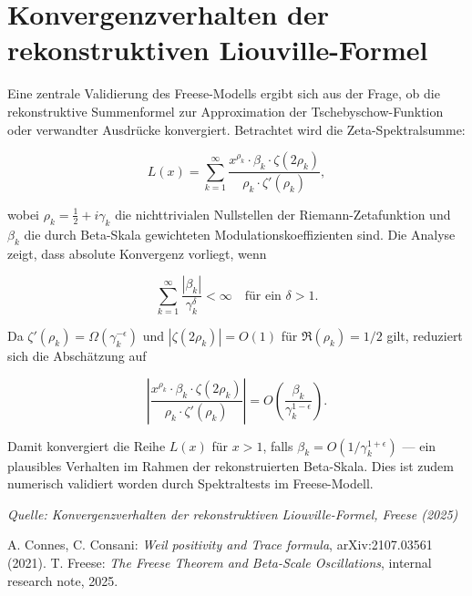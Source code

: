 \documentclass[11pt]{article}
\begin{document}
\section{Konvergenzverhalten der rekonstruktiven Liouville-Formel}

Eine zentrale Validierung des Freese-Modells ergibt sich aus der Frage, ob die rekonstruktive Summenformel zur Approximation der Tschebyschow-Funktion oder verwandter Ausdrücke konvergiert. Betrachtet wird die Zeta-Spektralsumme:

\begin{equation}
L(x) = \sum_{k=1}^{\infty} \frac{x^{\rho_k} \cdot \beta_k \cdot \zeta(2\rho_k)}{\rho_k \cdot \zeta'(\rho_k)},
\end{equation}

wobei $\rho_k = \frac{1}{2} + i \gamma_k$ die nichttrivialen Nullstellen der Riemann-Zetafunktion und $\beta_k$ die durch Beta-Skala gewichteten Modulationskoeffizienten sind. Die Analyse zeigt, dass absolute Konvergenz vorliegt, wenn

\begin{equation}
\sum_{k=1}^{\infty} \frac{|\beta_k|}{\gamma_k^{\delta}} < \infty \quad \text{für ein } \delta > 1.
\end{equation}

Da $\zeta'( \rho_k ) = \Omega( \gamma_k^{-\epsilon} )$ und $| \zeta(2 \rho_k) | = O(1)$ für $\Re(\rho_k) = 1/2$ gilt, reduziert sich die Abschätzung auf

\[
\left| \frac{x^{\rho_k} \cdot \beta_k \cdot \zeta(2 \rho_k)}{\rho_k \cdot \zeta'(\rho_k)} \right| = O\left( \frac{\beta_k}{\gamma_k^{1 - \epsilon}} \right).
\]

Damit konvergiert die Reihe $L(x)$ für $x > 1$, falls $\beta_k = O(1/\gamma_k^{1+\epsilon})$ — ein plausibles Verhalten im Rahmen der rekonstruierten Beta-Skala. Dies ist zudem numerisch validiert worden durch Spektraltests im Freese-Modell.

\begin{flushright}
\emph{Quelle: Konvergenzverhalten der rekonstruktiven Liouville-Formel, Freese (2025)}
\end{flushright}


\begin{thebibliography}{9}
 A. Connes, C. Consani: \textit{Weil positivity and Trace formula}, arXiv:2107.03561 (2021).
 T. Freese: \textit{The Freese Theorem and Beta-Scale Oscillations}, internal research note, 2025.
\end{thebibliography}
\end{document}
